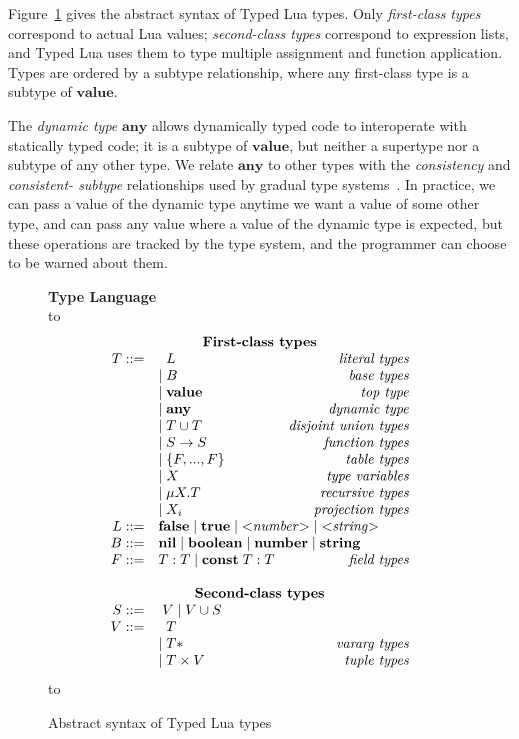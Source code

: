 \documentclass[preprint]{sig-alternate}
\newcommand{\Any}{\mathbf{any}}
\newcommand{\Top}{\mathbf{value}}
\newcommand{\Nil}{\mathbf{nil}}
\newcommand{\False}{\mathbf{false}}
\newcommand{\True}{\mathbf{true}}
\newcommand{\Boolean}{\mathbf{boolean}}
\newcommand{\Number}{\mathbf{number}}
\newcommand{\String}{\mathbf{string}}
\newcommand{\Const}{\mathbf{const}}
\def\dstart{\hbox to \hsize{\vrule depth 4pt\hrulefill\vrule depth 4pt}}
\def\dend{\hbox to \hsize{\vrule height 4pt\hrulefill\vrule height 4pt}}
\begin{document}
Figure~\ref{fig:typelang} gives the abstract syntax of Typed Lua
types. Only {\em first-class types} correspond to actual Lua
values; {\em second-class types} correspond to expression lists,
and Typed Lua uses them to type multiple assignment and function
application. Types are ordered by a subtype relationship, where
any first-class type is a subtype of $\Top$.

The {\em dynamic type} $\Any$ allows dynamically typed code to
interoperate with statically typed code; it is a subtype of 
$\Top$, but
neither a supertype nor a subtype of any other type. We relate 
$\Any$
to other types with the {\em consistency} and {\em consistent-
subtype}
relationships used by gradual type systems~\citep{siek2006gradual,siek2007objects}.
 In practice, we can
pass a value of the dynamic type anytime we want a value of some
other type, and can pass any value where a value of the dynamic type
is expected, but these operations are tracked by the type system,
and the programmer can choose to be warned about them.

\begin{figure}[!ht]
\textbf{Type Language}\\
\dstart
$$
\begin{array}{rlr}
\multicolumn{3}{c}{\textbf{First-class types}} \\
T ::= & \;\; L & \textit{literal types}\\
& | \; B & \textit{base types}\\
& | \; \Top & \textit{top type}\\
& | \; \Any & \textit{dynamic type}\\
& | \; T \cup T & \textit{disjoint union types}\\
& | \; S \rightarrow S & \textit{function types}\\
& | \; \{F, ..., F\} & \textit{table types}\\
& | \; X & \textit{type variables}\\
& | \; \mu X.T & \textit{recursive types}\\
& | \; X_i & \textit{projection types}\\
L ::= & \multicolumn{2}{l}{\False \; | \; \True \; | \; {<}{\it number}{>} \; | \; {<}{\it string}{>} } \\
B ::= & \multicolumn{2}{l}{\Nil \; | \; \Boolean \; | \; \Number \; | \; \String} \\
F ::= & T:T \; | \; \Const \; T:T & \textit{field types} \\
\multicolumn{3}{c}{} \\
\multicolumn{3}{c}{\textbf{Second-class types}} \\
S ::= &  \multicolumn{2}{l}{\; V \; | \; V \cup S} \\
V ::= & \;\; T & \\
& | \; T* & \textit{vararg types}\\
& | \; T \times V & \textit{tuple types}
\end{array}
$$
\dend
\caption{Abstract syntax of Typed Lua types}
\label{fig:typelang}
\end{figure}
\end{document}
